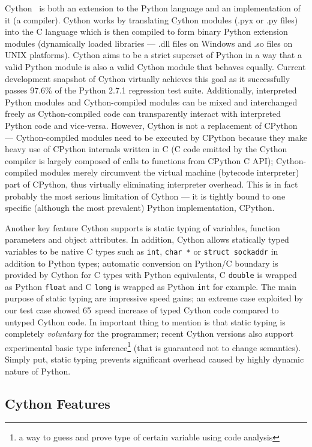 Cython~\cite{BehBraCitDalSelSmi:11} is both an extension to the Python language and an implementation
of it (a compiler). Cython works by translating Cython modules (.pyx or .py files) into the C language which is
then compiled to form binary Python extension modules (dynamically loaded libraries --- .dll files
on Windows and .so files on UNIX platforms). Cython aims to be a strict superset of Python in a way
that a valid Python module is also a valid Cython module that behaves equally. Current development
snapshot of Cython virtually achieves this goal as it successfully passes 97.6\% of the Python 2.7.1
regression test suite. Additionally, interpreted Python modules and Cython-compiled modules can be
mixed and interchanged freely as Cython-compiled code can transparently interact with interpreted
Python code and vice-versa. However, Cython is not a replacement of CPython --- Cython-compiled
modules need to be executed by CPython because they make heavy use of CPython internals written in C
(C code emitted by the Cython compiler is largely composed of calls to functions from CPython C API);
Cython-compiled modules merely circumvent the virtual machine (bytecode interpreter) part of CPython,
thus virtually eliminating interpreter overhead. This is in fact probably the most serious
limitation of Cython --- it is tightly bound to one specific (although the most prevalent) Python
implementation, CPython.

Another key feature Cython supports is static typing of variables, function parameters and object
attributes. In addition, Cython allows statically typed variables to be native C types such as
\verb|int|, \verb|char *| or \verb|struct sockaddr| in addition to Python types; automatic
conversion on Python/C boundary is provided by Cython for C types with Python equivalents, C
\verb|double| is wrapped as Python \verb|float| and C \verb|long| is wrapped as Python
\verb|int| for example. The main purpose of static typing are impressive speed gains; an extreme
case exploited by our test case showed 65\x\ speed increase of typed Cython code compared
to untyped Cython code. In important thing to mention is that static typing is completely
\emph{voluntary} for the programmer; recent Cython versions also support experimental basic type
inference\footnote{a way to guess and prove type of certain variable using code analysis} (that
is guaranteed not to change semantics). Simply put, static typing prevents significant overhead
caused by highly dynamic nature of Python.

\subsection{Cython Features} \label{sec:CythonFeatures}

